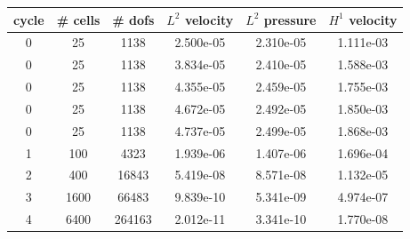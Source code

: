 \documentclass[10pt]{report}
\begin{document}
\begin{table}[H]
\begin{center}
\begin{tabular}{|c|c|c|c|c|c|} \hline
cycle & \# cells & \# dofs & $L^2$ velocity & $L^2$ pressure & $H^1$ velocity\\ \hline
0 & 25 & 1138 & 2.500e-05 & 2.310e-05 & 1.111e-03\\ \hline
0 & 25 & 1138 & 3.834e-05 & 2.410e-05 & 1.588e-03\\ \hline
0 & 25 & 1138 & 4.355e-05 & 2.459e-05 & 1.755e-03\\ \hline
0 & 25 & 1138 & 4.672e-05 & 2.492e-05 & 1.850e-03\\ \hline
0 & 25 & 1138 & 4.737e-05 & 2.499e-05 & 1.868e-03\\ \hline
1 & 100 & 4323 & 1.939e-06 & 1.407e-06 & 1.696e-04\\ \hline
2 & 400 & 16843 & 5.419e-08 & 8.571e-08 & 1.132e-05\\ \hline
3 & 1600 & 66483 & 9.839e-10 & 5.341e-09 & 4.974e-07\\ \hline
4 & 6400 & 264163 & 2.012e-11 & 3.341e-10 & 1.770e-08\\ \hline
\end{tabular}
\end{center}
\end{table}
\end{document}
